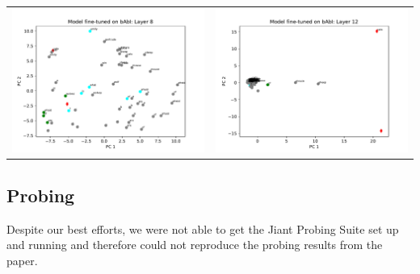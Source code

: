 \documentclass{article}
\begin{document}
	\begin{center}
		\begin{tabular}{ c c }
			\includegraphics[scale=0.4]{../badges/reproduced/visualization/babi/model-fine-tuned-on-babi--layer-8.pdf} &
			\includegraphics[scale=0.4]{../badges/reproduced/visualization/babi/model-fine-tuned-on-babi--layer-12.pdf}
		\end{tabular}
	\end{center}

	\subsection{Probing}
	Despite our best efforts, we were not able to get the Jiant Probing Suite set up and running and therefore could not reproduce the probing results from the paper. \\
	
\end{document}
